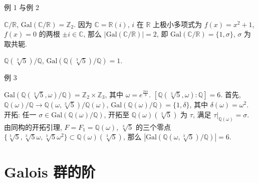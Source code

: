 
\begin{frame}{例 1 与例 2}

\begin{eg}
$\mathbb{C}/\mathbb{R}$, $\mathrm{Gal}(\mathbb{C}/\mathbb{R}) = \mathbb{Z}_2$.
因为 $\mathbb{C} = \mathbb{R}(i)$, $i$ 在 $\mathbb{R}$ 上极小多项式为
$f(x) = x^2 + 1$, $f(x) = 0$ 的两根 $\pm i \in \mathbb{C}$,
那么 $|\mathrm{Gal}(\mathbb{C}/\mathbb{R})| = 2$,
即 $\mathrm{Gal}(\mathbb{C}/\mathbb{R}) = \{ 1, \sigma \}$,
$\sigma$ 为取共轭.
\end{eg}

\pause

\begin{eg}
$\mathbb{Q}(\sqrt[3]{5})/\mathbb{Q}$,\quad
$\mathrm{Gal}(\mathbb{Q}(\sqrt[3]{5})/\mathbb{Q}) = 1$.
\end{eg}

\end{frame}


\begin{frame}{例 3}

\begin{eg}
$\mathrm{Gal}(\mathbb{Q}(\sqrt[3]{5}, \omega)/\mathbb{Q}) = \mathbb{Z}_2 \times \mathbb{Z}_3$,
其中 $\omega = e^{\frac{2 \pi i}{3}}$.
$[\mathbb{Q}(\sqrt[3]{5}, \omega):\mathbb{Q}] = 6$.
首先, $\mathbb{Q}(\omega)/\mathbb{Q} \to \mathbb{Q}(\omega, \sqrt[3]{5})/\mathbb{Q}(\omega)$,
$\mathrm{Gal}(\mathbb{Q}(\omega)/\mathbb{Q}) = \{ 1, \delta \}$,
其中 $\delta(\omega) = \omega^2$.
开拓: 任一 $\sigma \in \mathrm{Gal}(\mathbb{Q}(\omega)/\mathbb{Q})$,
开拓至 $\mathbb{Q}(\omega)(\sqrt[3]{5})$ 为 $\tau$, 满足 $\tau|_{\mathbb{Q}(\omega)} = \sigma$.
由同构的开拓引理, $F = F_1 = \mathbb{Q}(\omega)$,
$\sqrt[3]{5}$ 的三个零点 $\{ \sqrt[3]{5}, \sqrt[3]{5}\omega, \sqrt[3]{5}\omega^2 \}
\subset \mathbb{Q}(\omega)(\sqrt[3]{5})$,
那么 $|\mathrm{Gal}(\mathbb{Q}(\omega, \sqrt[3]{5})/\mathbb{Q})| = 6$.
\end{eg}

\end{frame}


\section[阶]{Galois 群的阶}


